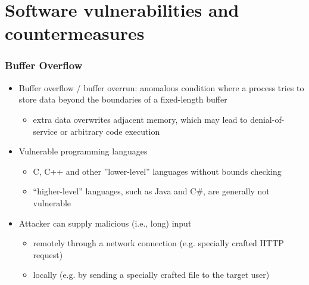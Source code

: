 \documentclass[final]{article}
\begin{document}
\section{Software vulnerabilities and countermeasures}
\subsubsection*{Buffer Overflow}
\begin{itemize}[nosep]
    \item Buffer overflow / buffer overrun: anomalous condition where a process tries to store data beyond the boundaries of a fixed-length buffer
          \begin{itemize}[nosep]
              \item extra data overwrites adjacent memory, which may lead to denial-of-service or arbitrary code execution
          \end{itemize}
    \item Vulnerable programming languages
          \begin{itemize}[nosep]
              \item C, C++ and other ''lower-level'' languages without bounds checking
              \item ``higher-level'' languages, such as Java and C\#, are generally not vulnerable
          \end{itemize}
    \item Attacker can supply malicious (i.e., long) input
          \begin{itemize}[nosep]
              \item remotely through a network connection (e.g. specially crafted HTTP request)
              \item locally (e.g. by sending a specially crafted file to the target user)
          \end{itemize}
\end{itemize}
\end{document}
